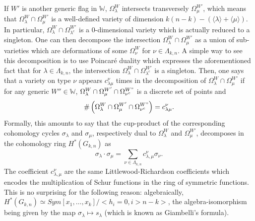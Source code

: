 \documentclass[10pt,11pt]{amsart}%
\begin{document}
If $W'$ is another generic flag in $\mathbb{W}$, $\Omega_{\lambda}^W$ intersects transversely $\Omega_{\mu}^{W'}$, which means that $\Omega_{\lambda}^W\cap \Omega_{\mu}^{W'}$ is a well-defined variety of dimension $k(n-k)-(\langle \lambda\rangle+\langle \mu\rangle)$. In particular, $\Omega_{\lambda}^W\cap \Omega_{\lambda^c}^{W'}$ is a $0$-dimensional variety which is actually reduced to a singleton. One can then decompose the intersection $\Omega_{\lambda}^W\cap \Omega_{\mu}^{W'}$ as a union of sub-varieties which are deformations of some $\Omega_{\nu}^W$ for $\nu\in \Lambda_{k,n}$. A simple way to see this decomposition is to use Poincaré duality which expresses the aforementioned fact that for $\lambda\in \Lambda_{k,n}$, the intersection $\Omega_{\lambda}^W\cap \Omega_{\lambda^c}^{W'}$ is a singleton. Then,  one says that a variety on type $\nu$ appears $c_{\lambda\mu}^\nu$ times in the decomposition of $\Omega_{\lambda}^W\cap \Omega_{\mu}^{W'}$ if for any generic $W''\in \mathbb{W}$, $\Omega_{\lambda}^W\cap \Omega_{\mu}^{W'}\cap \Omega_{\nu^c}^{W"}$ is a discrete set of points and
$$\#\left(\Omega_{\lambda}^W\cap \Omega_{\mu}^{W'}\cap \Omega_{\nu^c}^{W"}\right)=c_{\lambda\mu}^\nu.$$
Formally, this amounts to say that the cup-product of the corresponding cohomology cycles $\sigma_{\lambda}$ and $\sigma_{\mu}$, respectively dual to $\Omega^W_{\lambda}$ and $\Omega_{\mu}^{W'}$, decomposes in the cohomology ring $H^*(G_{k,n})$ as 
$$\sigma_{\lambda}\cdot\sigma_{\mu}=\sum_{\nu\in \Lambda_{k,n}}c_{\lambda,\mu}^\nu\sigma_{\nu}.$$
The coefficient $c_{\lambda,\mu}^\nu$ are the same Littlewood-Richardson coefficients which encodes the multiplication of Schur functions in the ring of symmetric functions. This is no surprising for the following reason: algebraically, $H^*(G_{k,n})\simeq Sym[x_1,\ldots,x_k]/< h_i=0, i>n-k>$, the algebra-isomorphism being given by the map $\sigma_\lambda\mapsto s_{\lambda}$ (which is known as Giambelli's formula).
\end{document}
